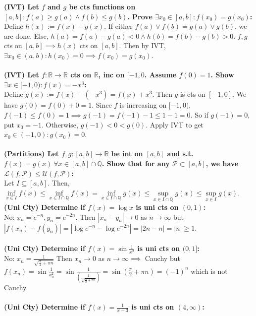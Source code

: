 \documentclass{letter}
\begin{document}
\textbf{(IVT) Let $f$ and $g$ be cts functions on $[a, b] : f(a) \geq g(a)
  \land f(b) \leq g(b)$. Prove $\exists x_0 \in [a, b] : f(x_0) =
  g(x_0)$:} \\
Define $h(x) := f(x) - g(x)$. If either $f(a) \lor f(b) = g(a) \lor
g(b)$, we are done. Else, $h(a) = f(a) - g(a) < 0 \land h(b) = f(b) -
g(b) > 0$. $f, g$ cts on $[a, b] \implies h(x)$ cts on $[a, b]$. Then
by IVT, $\exists x_0 \in (a, b) : h(x_0) = 0 \implies f(x_0) =
g(x_0)$. \\ \\
\textbf{(IVT) Let $f : \mathbb{R} \to \mathbb{R}$ cts on $\mathbb{R}$,
  inc on $[-1, 0$. Assume $f(0) = 1$. Show $\exists x \in [-1, 0) :
  f(x) = -x^3$:} \\
Define $g(x) := f(x) - (-x^3) = f(x) + x^3$. Then $g$ is cts on $[-1,
0]$. We have $g(0) = f(0) + 0 = 1$. Since $f$ is increasing on $[-1,
0)$, $f(-1) \leq f(0) = 1 \implies g(-1) = f(-1) - 1 \leq 1 - 1 =
0$. So if $g(-1) = 0$, put $x_0 = -1$. Otherwise, $g(-1) < 0 <
g(0)$. Apply IVT to get $x_0 \in (-1, 0) : g(x_0) = 0$. \\ \\
\textbf{(Partitions) Let $f, g : [a, b] \to \mathbb{R}$ be int on $[a,
  b]$ and s.t. $f(x) = g(x) \ \forall x \in [a, b] \cap
  \mathbb{Q}$. Show that for any $\mathcal{P} \subset [a, b]$, we have
  $\mathcal{L}(f, \mathcal{P}) \leq \mathcal{U}(f, \mathcal{P})$:} \\
Let $I \subseteq [a, b]$. Then, $\inf\limits_{x \in I} f(x) \leq
\inf\limits_{x \in I \cap \mathbb{Q}} f(x) = \inf\limits_{x \in I \cap
\mathbb{Q}} g(x) \leq \sup\limits_{x \in I \cap \mathbb{Q}} g(x) \leq
\sup\limits_{x \in I} g(x)$.
\newpage
\textbf{(Uni Cty) Determine if $f(x) = \log x$ is uni cts on $(0, 1)$:} \\
No: $x_n = e^{-n}, y_n = e^{-2n}$. Then $|x_n - y_n| \to 0$ as $n \to
\infty$ but $|f(x_n) - f(y_n)| = |\log e^{-n} - \log e^{-2n}| = |2n -
n| = |n| \geq 1$. \\ \\
\textbf{(Uni Cty) Determine if $f(x) = \sin \frac{1}{x^2}$ is uni cts on $(0, 1]$:} \\
No: $x_n = \frac{1}{\sqrt{\frac{\pi}{2} + \pi n}}$ Then $x_n \to 0$ as
$n \to \infty \implies$ Cauchy but $f(x_n) = \sin \frac{1}{x_n^2} =
\sin \frac{1}{\left(\frac{1}{\sqrt{\frac{\pi}{2} + \pi n}}\right)} = \sin
\left( \frac{\pi}{2} + \pi n \right) = (-1)^n$ which is not Cauchy. \\
\\
\textbf{(Uni Cty) Determine if $f(x) = \frac{1}{x - 3}$ is uni cts on $(4, \infty)$:} \\
\end{document}

